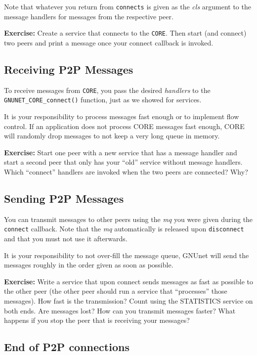 \documentclass[10pt]{article}
\newcommand{\exercise}[1]{\noindent\begin{boxedminipage}{\textwidth}{\bf Exercise:} #1 \end{boxedminipage}}
\begin{document}
Note that whatever you return from {\tt connects} is given as the
{\it cls} argument to the message handlers for messages from
the respective peer.

\exercise{Create a service that connects to the \texttt{CORE}.  Then
start (and connect) two peers and print a message once your connect
callback is invoked.}

\subsection{Receiving P2P Messages}

To receive messages from \texttt{CORE}, you pass the desired
{\em handlers} to the {\tt GNUNET\_CORE\_connect()} function,
just as we showed for services.

It is your responsibility to process messages fast enough or
to implement flow control. If an application does not process
CORE messages fast enough, CORE will randomly drop messages
to not keep a very long queue in memory.

\exercise{Start one peer with a new service that has a message
handler and start a second peer that only has your ``old'' service
without message handlers.  Which ``connect'' handlers are invoked when
the two peers are connected?  Why?}


\subsection{Sending P2P Messages}

You can transmit messages to other peers using the {\it mq} you were
given during the {\tt connect} callback.  Note that the {\it mq}
automatically is released upon {\tt disconnect} and that you must
not use it afterwards.

It is your responsibility to not over-fill the message queue, GNUnet
will send the messages roughly in the order given as soon as possible.

\exercise{Write a service that upon connect sends messages as
fast as possible to the other peer (the other peer should run a
service that ``processes'' those messages).  How fast is the
transmission?  Count using the STATISTICS service on both ends.  Are
messages lost? How can you transmit messages faster?  What happens if
you stop the peer that is receiving your messages?}


\subsection{End of P2P connections}
\end{document}
